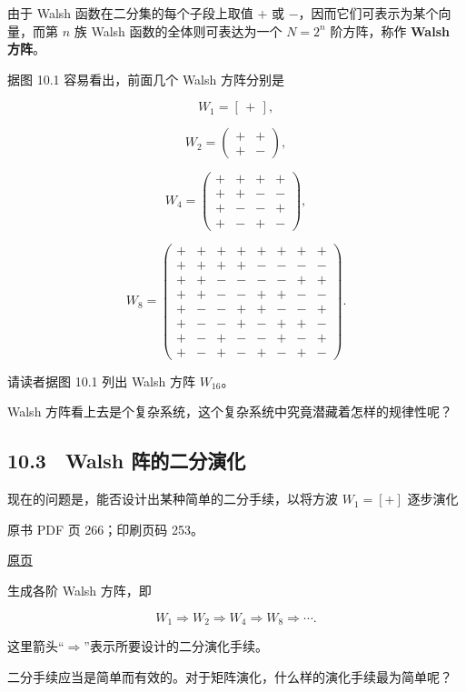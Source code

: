 由于 Walsh 函数在二分集的每个子段上取值 \(+\) 或 \(-\)，因而它们可表示为某个向量，而第 \(n\) 族 Walsh 函数的全体则可表达为一个 \(N=2^n\) 阶方阵，称作 \textbf{Walsh 方阵}。

据图 10.1 容易看出，前面几个 Walsh 方阵分别是

\[
W_1=[\,+\,],
\]

\[
W_2=\begin{pmatrix}+&+\\+&-\end{pmatrix},
\]

\[
W_4=\begin{pmatrix}
+&+&+&+\\
+&+&-&-\\
+&-&-&+\\
+&-&+&-
\end{pmatrix},
\]

\[
W_8=\begin{pmatrix}
+&+&+&+&+&+&+&+\\
+&+&+&+&-&-&-&-\\
+&+&-&-&-&-&+&+\\
+&+&-&-&+&+&-&-\\
+&-&-&+&+&-&-&+\\
+&-&-&+&-&+&+&-\\
+&-&+&-&-&+&-&+\\
+&-&+&-&+&-&+&-
\end{pmatrix}.
\]

请读者据图 10.1 列出 Walsh 方阵 \(W_{16}\)。

Walsh 方阵看上去是个复杂系统，这个复杂系统中究竟潜藏着怎样的规律性呢？

\subsection{10.3　Walsh 阵的二分演化}\label{ch10-walsh-ux9635ux7684ux4e8cux5206ux6f14ux5316}

现在的问题是，能否设计出某种简单的二分手续，以将方波 \(W_1=[+]\) 逐步演化

\clearpage

原书 PDF 页 266；印刷页码 253。

\href{source-images/pdf-266.jpeg}{原页}

生成各阶 Walsh 方阵，即

\[
W_1\Rightarrow W_2\Rightarrow W_4\Rightarrow W_8\Rightarrow\cdots.
\]

这里箭头``\(\Rightarrow\)''表示所要设计的二分演化手续。

二分手续应当是简单而有效的。对于矩阵演化，什么样的演化手续最为简单呢？

